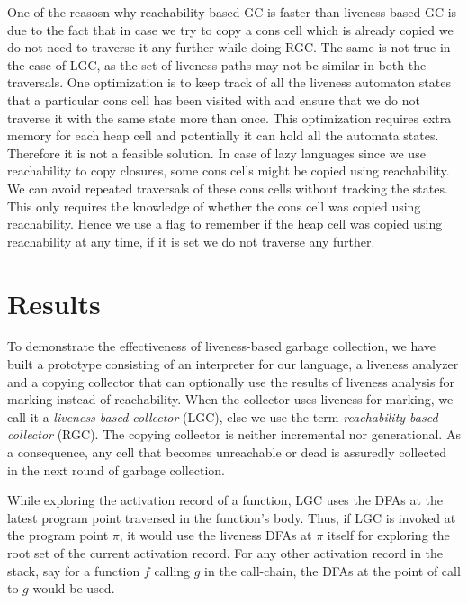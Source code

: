 \documentclass[9pt]{sigplanconf}
\begin{document}
\begin{enumerate}
\begin{enumerate}
\end{enumerate}
One of the  reasosn why reachability based GC  is faster than liveness
based GC is  due to the fact that  in case we try to copy  a cons cell
which is  already copied  we do  not need to  traverse it  any further
while doing RGC. The  same is not true in the case  of LGC, as the set
of  liveness paths  may not  be similar  in both  the  traversals. One
optimization is  to keep  track of all  the liveness  automaton states
that a particular  cons cell has been visited with  and ensure that we
do  not  traverse  it  with  the  same state  more  than  once.   This
optimization requires extra memory  for each heap cell and potentially
it can hold  all the automata states.  Therefore it  is not a feasible
solution. In case of lazy  languages since we use reachability to copy
closures, some cons  cells might be copied using  reachability. We can
avoid  repeated traversals of  these cons  cells without  tracking the
states. This only requires the  knowledge of whether the cons cell was
copied using  reachability.  Hence  we use a  flag to remember  if the
heap cell was  copied using reachability at any time, if  it is set we
do not traverse any further.

\section{Results}
To demonstrate the effectiveness of liveness-based garbage collection,
we  have  built a  prototype  consisting  of  an interpreter  for  our
language,  a  liveness  analyzer  and  a copying  collector  that  can
optionally use the results of liveness analysis for marking instead of
reachability. When the collector uses liveness for marking, we call it
a  {\em liveness-based  collector} (LGC),  else we  use the  term {\em
  reachability-based  collector}  (RGC).   The  copying  collector  is
neither incremental nor generational.  As a consequence, any cell that
becomes unreachable or  dead is assuredly collected in  the next round
of garbage collection.

While exploring the activation record of a function, LGC uses the DFAs
at  the latest  program  point traversed  in the function's body.
Thus, if  LGC
is invoked  at the program point   $\pi$,  it would  use  the
liveness  DFAs at  $\pi$ itself for exploring the root set of the
current activation record. For any other activation record in the
stack, say for a function ${\mathit f}$ calling ${\mathit g}$ in the
call-chain,
the DFAs at the point of call to  ${\mathit g}$ would be used.




\end{enumerate}
\end{document}
